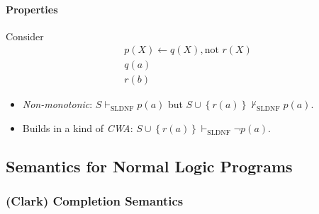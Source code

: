 \documentclass[twocolumn,english]{article}
\begin{document}
\paragraph{Properties}

Consider
\begin{align*}
 & p\left(X\right)\leftarrow q\left(X\right),\text{not }r\left(X\right)\\
 & q\left(a\right)\\
 & r\left(b\right)
\end{align*}
\begin{itemize}
\item \emph{Non-monotonic}: $S\vdash_{\text{SLDNF}}p\left(a\right)$ but
$S\cup\left\{ r\left(a\right)\right\} \not\vdash_{\text{SLDNF}}p\left(a\right)$.
\item Builds in a kind of \emph{CWA}: $S\cup\left\{ r\left(a\right)\right\} \vdash_{\text{SLDNF}}\lnot p\left(a\right)$.
\end{itemize}

\subsection{Semantics for Normal Logic Programs}

\subsubsection{(Clark) Completion Semantics}
\end{document}
